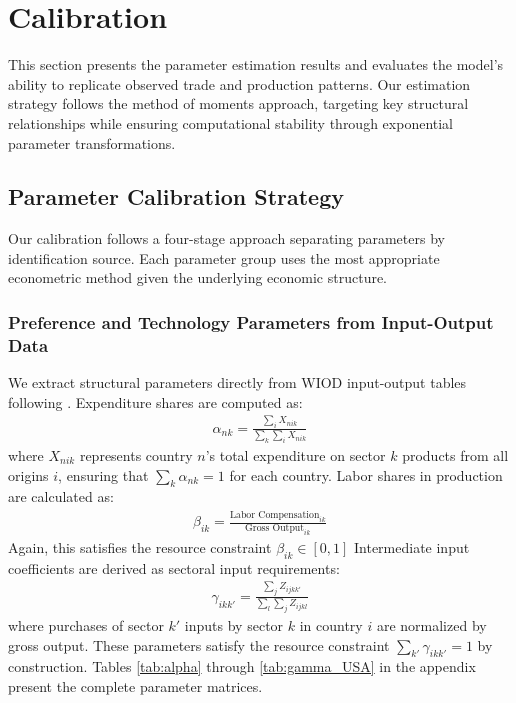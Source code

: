 \section{Calibration}

This section presents the parameter estimation results and evaluates the model's ability to replicate observed trade and production patterns. Our estimation strategy follows the method of moments approach, targeting key structural relationships while ensuring computational stability through exponential parameter transformations.

\subsection{Parameter Calibration Strategy}

Our calibration follows a four-stage approach separating parameters by identification source. Each parameter group uses the most appropriate econometric method given the underlying economic structure. 

\subsubsection{Preference and Technology Parameters from Input-Output Data}

We extract structural parameters directly from WIOD input-output tables following \cite{costinot2012TheReviewofEconomicStudies}. Expenditure shares are computed as:
\begin{align*}
\alpha_{nk} = \frac{\sum_i X_{nik}}{\sum_k \sum_i X_{nik}}
\end{align*}
where $X_{nik}$ represents country $n$'s total expenditure on sector $k$ products from all origins $i$, ensuring that $\sum_k \alpha_{nk} = 1$ for each country. Labor shares in production are calculated as:
\begin{align*}
\beta_{ik} = \frac{\text{Labor Compensation}_{ik}}{\text{Gross Output}_{ik}}
\end{align*}
Again, this satisfies the resource constraint $\beta_{ik} \in [0,1]$ Intermediate input coefficients are derived as sectoral input requirements:
\begin{align*}
\gamma_{ikk'} = \frac{\sum_j Z_{ijkk'}}{\sum_{l}\sum_j Z_{ijkl}}
\end{align*}
where purchases of sector $k'$ inputs by sector $k$ in country $i$ are normalized by gross output. These parameters satisfy the resource constraint $\sum_{k'} \gamma_{ikk'} = 1$ by construction. Tables \ref{tab:alpha} through \ref{tab:gamma_USA} in the appendix present the complete parameter matrices.

